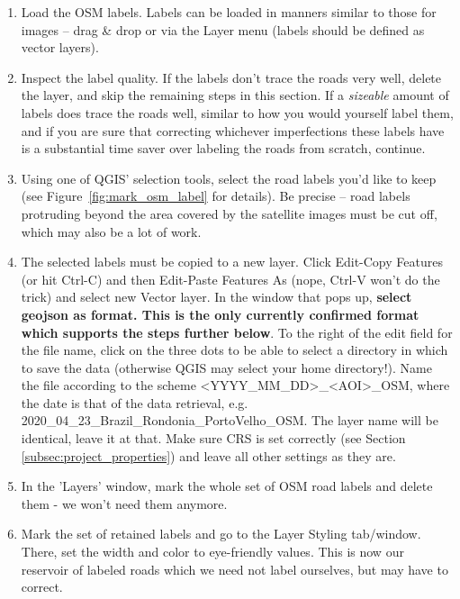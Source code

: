 \documentclass[12pt,a4paper]{scrartcl}
\begin{document}
\begin{enumerate}
	\item Load the OSM labels. Labels can be loaded in manners similar to those for images -- drag \& drop or via the Layer menu (labels should be defined as vector layers).
	\item Inspect the label quality. If the labels don't trace the roads very well, delete the layer, and skip the remaining steps in this section. If a \textit{sizeable} amount of labels does trace the roads well, similar to how you would yourself label them, and if you are sure that correcting whichever imperfections these labels have is a substantial time saver over labeling the roads from scratch, continue.
	\item Using one of QGIS' selection tools, select the road labels you'd like to keep (see Figure~\ref{fig:mark_osm_label} for details). Be precise -- road labels protruding beyond the area covered by the satellite images must be cut off, which may also be a lot of work.
	\item The selected labels must be copied to a new layer. Click Edit-Copy Features (or hit Ctrl-C) and then Edit-Paste Features As (nope, Ctrl-V won't do the trick) and select new Vector layer. In the window that pops up, \textbf{select geojson as format. This is the only currently confirmed format which supports the steps further below}. To the right of the edit field for the file name, click on the three dots to be able to select a directory in which to save the data (otherwise QGIS may select your home directory!). Name the file according to the scheme <YYYY\_MM\_DD>\_<AOI>\_OSM, where the date is that of the data retrieval, e.g. 2020\_04\_23\_Brazil\_Rondonia\_PortoVelho\_OSM. The layer name will be identical, leave it at that. Make sure CRS is set correctly (see Section \ref{subsec:project_properties}) and leave all other settings as they are.
	\item In the 'Layers' window, mark the whole set of OSM road labels and delete them - we won't need them anymore.
	\item Mark the set of retained labels and go to the Layer Styling tab/window. There, set the width and color to eye-friendly values. This is now our reservoir of labeled roads which we need not label ourselves, but may have to correct.
\end{enumerate}
\end{document}
